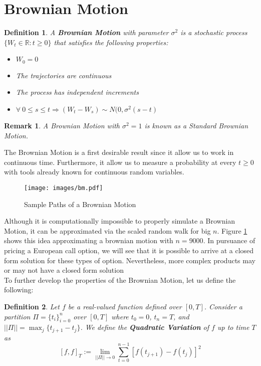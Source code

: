 \documentclass[11pt]{report}
\newtheorem{definition}{Definition}[chapter]
\newtheorem{remark}{Remark}[chapter]
\begin{document}
\section{Brownian Motion}
\begin{definition}\label{def:brownian_motion}
	A \textbf{Brownian Motion} with parameter $\sigma^2$ is a stochastic process $\{W_t \in \mathbb{R}:t\geq 0\}$ that satisfies the following properties:
	\begin{itemize}
		\item $W_0 = 0$
		\item The trajectories are continuous
		\item The process has independent increments
		\item $\forall \ 0 \leq s \leq t \Longrightarrow (W_t - W_s) \sim N(0, \sigma^2(s - t)$
	\end{itemize}
\end{definition}

\begin{remark}
	A Brownian Motion with $\sigma^2 = 1$ is known as a Standard Brownian Motion.
\end{remark}

The Brownian Motion is a first desirable result since it allow us to work in continuous time. Furthermore, it allow us to measure a probability at every $t\geq 0$ with tools already known for continuous random variables. 

\begin{figure}[h]
	\centering
	\label{fig:Brownian_Motion}
	\texttt{[image: images/bm.pdf]}	
	\caption{Sample Paths of a Brownian Motion}
\end{figure}

Although it is computationally impossible to properly simulate a Brownian Motion, it can be approximated via the scaled random walk for big $n$. Figure \ref{fig:Brownian_Motion} shows this idea approximating a brownian motion with $n=9000$. In pursuance of pricing a European call option, we will see that it is possible to arrive at a closed form solution for these types of option. Nevertheless, more complex products may or may not have a closed form solution\\

To further develop the properties of the Brownian Motion, let us define the following:
\begin{definition}\label{def:quadratic_variation}
	Let $f$ be a real-valued function defined over $[0, T]$. Consider a partition $\Pi= \{t_i\}_{i=0}^{n}$ over $[0, T]$ where $t_0 = 0$, $t_n = T$, and $||\Pi|| = \max_j\{t_{j+1} - t_j\}$. We define the \textbf{Quadratic Variation} of $f$ up to time $T$ as
	\[
		[f, f]_T := \lim_{||\Pi|| \to 0} \sum_{t=0}^{n-1}\left[f(t_{j+1}) - f(t_{j})\right]^2
	\]
\end{definition}
\end{document}
